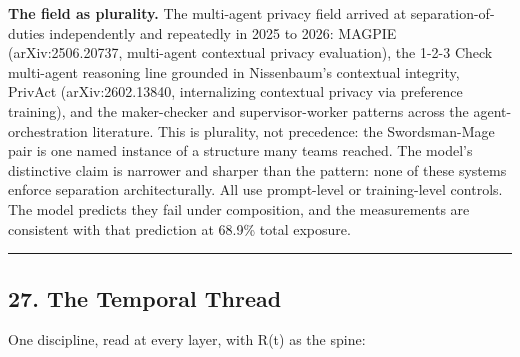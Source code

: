 \documentclass[
]{article}
\newcounter{none} %
\begin{document}
\textbf{The field as plurality.} The multi-agent privacy field arrived
at separation-of-duties independently and repeatedly in 2025 to 2026:
MAGPIE (arXiv:2506.20737, multi-agent contextual privacy evaluation),
the 1-2-3 Check multi-agent reasoning line grounded in Nissenbaum's
contextual integrity, PrivAct (arXiv:2602.13840, internalizing
contextual privacy via preference training), and the maker-checker and
supervisor-worker patterns across the agent-orchestration literature.
This is plurality, not precedence: the Swordsman-Mage pair is one named
instance of a structure many teams reached. The model's distinctive
claim is narrower and sharper than the pattern: none of these systems
enforce separation architecturally. All use prompt-level or
training-level controls. The model predicts they fail under composition,
and the measurements are consistent with that prediction at 68.9\% total
exposure.

\begin{center}\rule{0.5\linewidth}{0.5pt}\end{center}

\subsection{27. The Temporal Thread}\label{the-temporal-thread}

One discipline, read at every layer, with R(t) as the spine:
\end{document}
